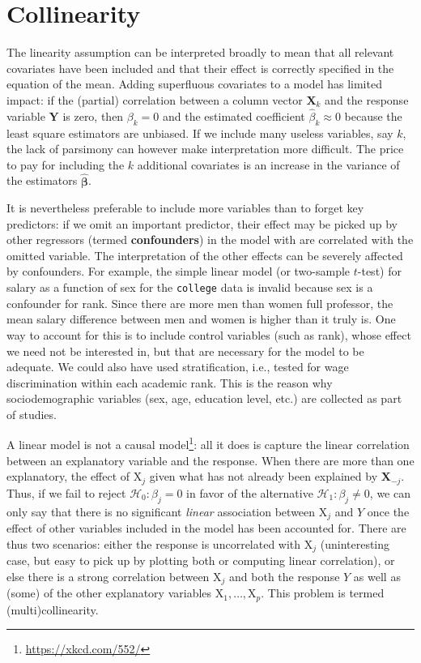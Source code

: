 \documentclass[
  11pt,
  letterpaper,
]{book}
\renewcommand{\href}[2]{#2\footnote{\url{#1}}}
\theoremstyle{definition}
\theoremstyle{definition}
\theoremstyle{definition}
\theoremstyle{remark}
\begin{document}
\hypertarget{collinearity}{%
\section{Collinearity}\label{collinearity}}

The linearity assumption can be interpreted broadly to mean that all relevant covariates have been included and that their effect is correctly specified in the equation of the mean. Adding superfluous covariates to a model has limited impact: if the (partial) correlation between a column vector \(\mathbf{X}_k\) and the response variable \(\boldsymbol{Y}\) is zero, then \(\beta_k=0\) and the estimated coefficient \(\widehat{\beta}_k \approx 0\) because the least square estimators are unbiased. If we include many useless variables, say \(k\), the lack of parsimony can however make interpretation more difficult. The price to pay for including the \(k\) additional covariates is an increase in the variance of the estimators \(\widehat{\boldsymbol{\beta}}\).

It is nevertheless preferable to include more variables than to forget key predictors: if we omit an important predictor, their effect may be picked up by other regressors (termed \textbf{confounders}) in the model with are correlated with the omitted variable. The interpretation of the other effects can be severely affected by confounders. For example, the simple linear model (or two-sample \(t\)-test) for salary as a function of sex for the \texttt{college} data is invalid because sex is a confounder for rank. Since there are more men than women full professor, the mean salary difference between men and women is higher than it truly is. One way to account for this is to include control variables (such as rank), whose effect we need not be interested in, but that are necessary for the model to be adequate. We could also have used stratification, i.e., tested for wage discrimination within each academic rank. This is the reason why sociodemographic variables (sex, age, education level, etc.) are collected as part of studies.

A linear model is not a \href{https://xkcd.com/552/}{causal model}: all it does is capture the linear correlation between an explanatory variable and the response. When there are more than one explanatory, the effect of \(\mathrm{X}_j\) given what has not already been explained by \(\mathbf{X}_{-j}\). Thus, if we fail to reject \(\mathscr{H}_0:\beta_j=0\) in favor of the alternative \(\mathscr{H}_1: \beta_j \neq 0\), we can only say that there is no significant \emph{linear} association between \(\mathrm{X}_j\) and \(Y\) once the effect of other variables included in the model has been accounted for. There are thus two scenarios: either the response is uncorrelated with \(\mathrm{X}_j\) (uninteresting case, but easy to pick up by plotting both or computing linear correlation), or else there is a strong correlation between \(\mathrm{X}_j\) and both the response \(Y\) as well as (some) of the other explanatory variables \(\mathrm{X}_1, \ldots, \mathrm{X}_p\). This problem is termed (multi)collinearity.
\end{document}
